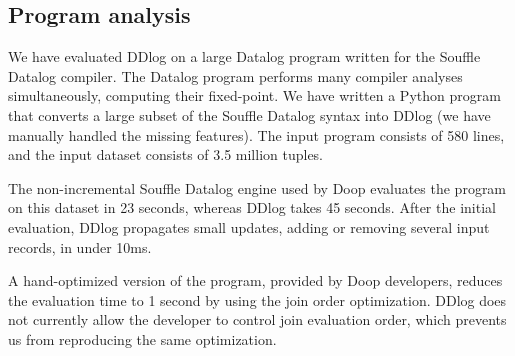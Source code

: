 
\subsection{Program analysis}

We have evaluated DDlog on a large Datalog program written for the
Souffle Datalog compiler.  The Datalog program performs many
compiler analyses simultaneously, computing their fixed-point.  We
have written a Python program that converts a large subset of the
Souffle Datalog syntax into DDlog (we have manually handled the
missing features).  The input program consists of 580 lines, and the
input dataset consists of 3.5 million tuples.

The non-incremental Souffle Datalog engine used by Doop evaluates the
program on this dataset in 23 seconds, whereas DDlog takes 45 seconds.
After the initial evaluation, DDlog propagates small updates, adding or
removing several input records, in under 10ms.  

A hand-optimized version of the program, provided by Doop developers,
reduces the evaluation time to 1 second by using the join order
optimization.  DDlog does not currently allow the developer to
control join evaluation order, which prevents us from reproducing the
same optimization.


%
